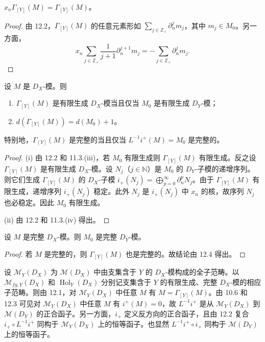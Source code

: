 \begin{corollary}
$x_n\Gamma_{[Y]}(M)=\Gamma_{[Y]}(M)$。
\end{corollary}

\begin{proof}
由 12.2，$\Gamma_{[Y]}(M)$ 的任意元素形如 $\sum_{j\in\mathbb{Z}_+}\partial_n^j m_j$，其中 $m_j\in M_0$。另一方面，
$$x_n\sum_{j\in\mathbb{Z}_+}\frac{1}{j+1}\partial_n^{j+1}m_j=-\sum_{j\in\mathbb{Z}_+}\partial_n^j m_j.$$
\end{proof}

\begin{corollary}
设 $M$ 是 $D_X$-模。则
\begin{enumerate}[label=(\roman*)]
  \item $\Gamma_{[Y]}(M)$ 是有限生成 $D_X$-模当且仅当 $M_0$ 是有限生成 $D_Y$-模；
  \item $d(\Gamma_{[Y]}(M))=d(M_0)+1$。
\end{enumerate}
特别地，$\Gamma_{[Y]}(M)$ 是完整的当且仅当 $L^{-1}i^+(M)=M_0$ 是完整的。
\end{corollary}

\begin{proof}
(i) 由 12.2 和 11.3.(iii)，若 $M_0$ 有限生成则 $\Gamma_{[Y]}(M)$ 有限生成。反之设 $\Gamma_{[Y]}(M)$ 是有限生成 $D_X$-模。设 $N_j$（$j\in\mathbb{N}$）是 $M_0$ 的 $D_Y$-子模的递增序列。则它们生成 $\Gamma_{[Y]}(M)$ 的 $D_X$-子模 $i_+(N_j)=\bigoplus_{p=0}^{\infty}\partial_n^p N_j$。由于 $\Gamma_{[Y]}(M)$ 有限生成，递增序列 $i_+(N_j)$ 稳定。此外 $N_j$ 是 $i_+(N_j)$ 中 $x_n$ 的核，故序列 $N_j$ 也必稳定。因此 $M_0$ 有限生成。

(ii) 由 12.2 和 11.3.(iv) 得出。
\end{proof}

\begin{corollary}
设 $M$ 是完整 $D_X$-模。则 $M_0$ 是完整 $D_Y$-模。
\end{corollary}

\begin{proof}
若 $M$ 是完整的，则 $\Gamma_{[Y]}(M)$ 也是完整的。故结论由 12.4 得出。
\end{proof}

设 $\mathcal{M}_Y(D_X)$ 为 $\mathcal{M}(D_X)$ 中由支集含于 $Y$ 的 $D_X$-模构成的全子范畴。以 $\mathcal{M}_{fg,Y}(D_X)$ 和 $\operatorname{Hol}_Y(D_X)$ 分别记支集含于 $Y$ 的有限生成、完整 $D_X$-模的相应子范畴。则由 12.1，对 $\mathcal{M}_Y(D_X)$ 中任意 $M$ 有 $M=\Gamma_{[Y]}(M)$。由 10.6 和 12.3 可见对 $\mathcal{M}_Y(D_X)$ 中任意 $M$ 有 $i^+(M)=0$，故 $L^{-1}i^+$ 是从 $\mathcal{M}_Y(D_X)$ 到 $\mathcal{M}(D_Y)$ 的正合函子。另一方面，$i_+$ 定义反方向的正合函子，且由 12.2 复合 $i_+\circ L^{-1}i^+$ 同构于 $\mathcal{M}_Y(D_X)$ 上的恒等函子。也显然 $L^{-1}i^+\circ i_+$ 同构于 $\mathcal{M}(D_Y)$ 上的恒等函子。

